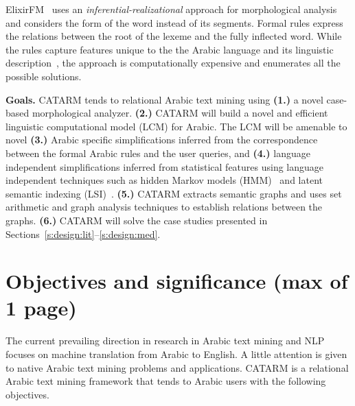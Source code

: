 \documentclass[12pt]{article}
\newcommand{\noTrRL}[1]{\transfalse\RL{#1}\transtrue}
\begin{document}
ElixirFM~\cite{Otakar:07} uses an {\em inferential-realizational}
approach for morphological analysis
and considers the form of the word 
\noTrRL{.sarf}  instead of its segments. 
Formal rules express the relations between 
the root of the lexeme and the fully inflected word. 
While the rules capture features unique to the 
the Arabic language and its linguistic description~\cite{Badawi:04},
the approach is computationally expensive and enumerates 
all the possible solutions. 

{\bf Goals.} 
CATARM tends to relational Arabic text mining using 
{\bf (1.)} a novel case-based morphological analyzer.
{\bf (2.)} CATARM will build a novel and efficient 
linguistic computational model (LCM) for Arabic. 
The LCM will be amenable to novel 
{\bf (3.)} Arabic specific simplifications 
inferred from the correspondence between the formal Arabic rules
and the user queries, and 
{\bf (4.)} language independent simplifications
inferred from statistical features %
using language independent techniques such as 
hidden Markov models (HMM)~\cite{JanHMM06}
and latent semantic indexing (LSI)~\cite{LSI89}.
{\bf (5.)} CATARM extracts semantic graphs 
and uses set arithmetic and graph analysis techniques
to establish relations between the graphs. 
{\bf (6.)} CATARM will solve the case studies 
presented in Sections~\ref{s:design:lit}--\ref{s:design:med}.

\pagebreak

\section{Objectives and significance (max of 1 page) } 
\label{s:objectives}

The current prevailing direction in research 
in Arabic text mining and NLP focuses on machine translation from 
Arabic to English. 
A little attention is given to native Arabic text mining 
problems and applications. 
CATARM is a relational Arabic text mining 
framework that tends to Arabic users 
with the following objectives.
\end{document}

